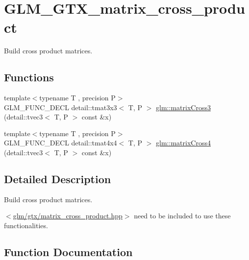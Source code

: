 \hypertarget{group__gtx__matrix__cross__product}{}\section{G\+L\+M\+\_\+\+G\+T\+X\+\_\+matrix\+\_\+cross\+\_\+product}
\label{group__gtx__matrix__cross__product}


Build cross product matrices.  


\subsection*{Functions}
\begin{DoxyCompactItemize}
\item 
{\footnotesize template$<$typename T , precision P$>$ }\\G\+L\+M\+\_\+\+F\+U\+N\+C\+\_\+\+D\+E\+CL detail\+::tmat3x3$<$ T, P $>$ \hyperlink{group__gtx__matrix__cross__product_gaebbd4b4436b55c14b6d0b973167a25e4}{glm\+::matrix\+Cross3} (detail\+::tvec3$<$ T, P $>$ const \&x)
\item 
{\footnotesize template$<$typename T , precision P$>$ }\\G\+L\+M\+\_\+\+F\+U\+N\+C\+\_\+\+D\+E\+CL detail\+::tmat4x4$<$ T, P $>$ \hyperlink{group__gtx__matrix__cross__product_gab3c272adc9c9fc1f7c26d6f353b4bb4b}{glm\+::matrix\+Cross4} (detail\+::tvec3$<$ T, P $>$ const \&x)
\end{DoxyCompactItemize}


\subsection{Detailed Description}
Build cross product matrices. 

$<$\hyperlink{matrix__cross__product_8hpp}{glm/gtx/matrix\+\_\+cross\+\_\+product.\+hpp}$>$ need to be included to use these functionalities. 

\subsection{Function Documentation}
